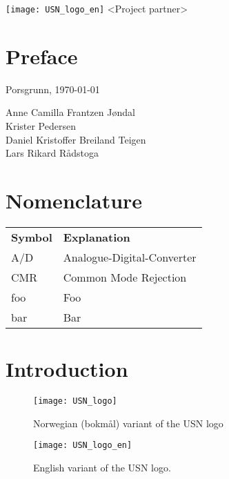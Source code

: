 \documentclass[%
project,    %
]{USN-MSc}
\newcommand{\myauthor}{%
G12_FM1015_2022
}
\newcommand{\myparticipants}{
Anne Camilla Frantzen Jøndal\\
Krister Pedersen\\
Daniel Kristoffer Breiland Teigen\\
Lars Rikard Rådstoga
}
\begin{document}
\USNtitlepage%
{%
  {}
   \texttt{[image: USN\_logo\_en]}}
{<Project partner>}
{%
\lipsum[6-7]
}


\chapter*{Preface}
\label{ch:preface}
\lipsum[1-3]
\bigskip
Porsgrunn, \today

\myparticipants %


\tableofcontents
{}

\listoffigures %

\listoftables  %

\chapter*{Nomenclature}
\label{sec:nomenclature}

\begin{longtable}{ll}
  \textbf{Symbol} & \textbf{Explanation}\endhead\\
  A/D	& Analogue-Digital-Converter \\
  CMR	& Common Mode Rejection \\
  foo	& Foo \\
  bar 	& Bar
\end{longtable}

\chapter{Introduction}
\label{ch:intro}
\lipsum[4]
\begin{figure}[!ht]
  \centering
  \texttt{[image: USN\_logo]}
  \caption{Norwegian (bokmål) variant of the USN logo}
  \label{fig:usn-logo}
\end{figure}
\lipsum[4]
\begin{figure}[!ht]
  \centering
  \texttt{[image: USN\_logo\_en]}
  \caption{English variant of the USN logo.}
  \label{fig:usn-logo-en}
\end{figure}
\lipsum
\end{document}
